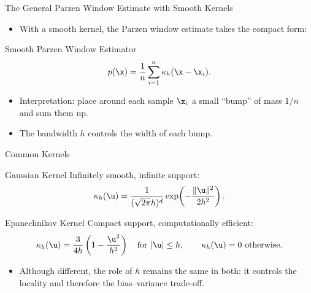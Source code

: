 \begin{frame}{The General Parzen Window Estimate with Smooth Kernels}
  \begin{itemize}
    \item With a smooth kernel, the Parzen window estimate takes the compact form:
  \end{itemize}
  \begin{block}{Smooth Parzen Window Estimator}
    \[
      p(\x) = \frac{1}{n}\sum_{i=1}^{n}\kappa_h(\x-\x_i).
    \]
  \end{block}
  \vspace{0.4em}
  \begin{itemize}
    \item Interpretation: place around each sample $\x_i$ a small ``bump'' of mass $1/n$ and sum them up.
    \item The bandwidth $h$ controls the \alert{width} of each bump.
  \end{itemize}
\end{frame}

\begin{frame}{Common Kernels}
  \begin{block}{Gaussian Kernel}
    Infinitely smooth, infinite support:
    \[
      \kappa_h(\u) = \frac{1}{(\sqrt{2\pi}h)^d}\exp\!\left(-\frac{\|\u\|^2}{2h^2}\right).
    \]
  \end{block}
  \vspace{0.4em}
  \begin{block}{Epanechnikov Kernel}
    Compact support, computationally efficient:
    \[
      \kappa_h(\u) = \frac{3}{4h}\left(1 - \frac{\u^2}{h^2}\right)\quad\text{for }|\u| \le h,
      \qquad
      \kappa_h(\u) = 0\text{ otherwise.}
    \]
  \end{block}
  \vspace{0.2em}
  \begin{itemize}
    \item Although different, the \alert{role of $h$} remains the same in both: it controls the locality and therefore the bias--variance trade-off.
  \end{itemize}
\end{frame}

